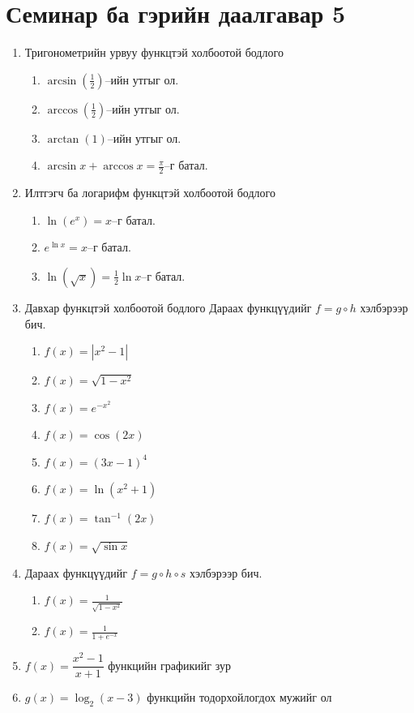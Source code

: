 \section{Семинар ба гэрийн даалгавар 5}
\begin{enumerate}
\item Тригонометрийн урвуу функцтэй холбоотой бодлого
\begin{enumerate}
\item $\arcsin(\frac{1}{2})$–ийн утгыг ол.
\item $\arccos(\frac{1}{2})$–ийн утгыг ол.
\item $\arctan(1)$–ийн утгыг ол.
\item $\arcsin x + \arccos x = \frac{\pi}{2}$–г батал.
\end{enumerate}
\item  Илтгэгч ба логарифм функцтэй холбоотой бодлого
\begin{enumerate}
\item $\ln(e^x) = x$–г батал.
\item $e^{\ln x} = x$–г батал.
\item $\ln(\sqrt{x}) = \frac{1}{2}\ln x$–г батал.
\end{enumerate}
\item Давхар функцтэй холбоотой бодлого
Дараах функцүүдийг $f = g \circ h$ хэлбэрээр бич.
\begin{enumerate}
\item $f(x) = |x^2 - 1|$ 
\item $f(x) = \sqrt{1 - x^2}$ 
\item $f(x) = e^{-x^2}$
\item $f(x) = \cos(2x)$ 
\item $f(x) = (3x - 1)^4$
\item $f(x) = \ln(x^2 + 1)$ 
\item $f(x) = \tan^{-1}(2x)$ 
\item $f(x) = \sqrt{\sin x}$
\end{enumerate}
\item Дараах функцүүдийг $f = g \circ h\circ s$ хэлбэрээр бич.
\begin{enumerate}
\item $f(x) = \frac{1}{\sqrt{1 - x^2}}$
\item $f(x) = \frac{1}{1 + e^{-x}}$ 
\end{enumerate}
\item $f(x) = \dfrac{x^2 - 1}{x + 1}$ функцийн графикийг зур
\item $g(x) = \log_2(x - 3)$ функцийн тодорхойлогдох мужийг ол

\end{enumerate}
